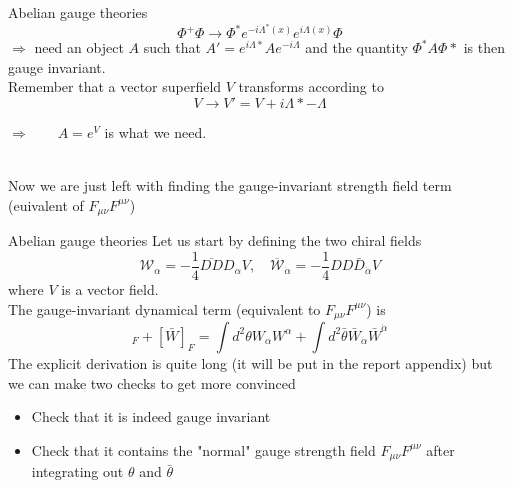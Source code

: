 \documentclass[10pt]{beamer}
\begin{document}
\begin{frame}{Abelian gauge theories}
\begin{equation*}
    \Phi^+\Phi \rightarrow \Phi^* e^{-i\Lambda^*(x)} e^{i\Lambda(x)} \Phi
\end{equation*}
$\Rightarrow$ need an object $A$ such that $A' = e^{i\Lambda*} A e^{-i\Lambda}$ and the 
quantity $\Phi^*A\Phi*$ is then gauge invariant. \\
Remember that a vector superfield $V$ transforms according to 
\begin{equation*}
    V \rightarrow V' = V + i{\Lambda* - \Lambda}
\end{equation*}
\centerline{$\Rightarrow \qquad A = e^V$ is what we need.} \\
Now we are just left with finding the gauge-invariant strength field term (euivalent of $F_{\mu\nu}F^{\mu\nu}$)
\end{frame}


\begin{frame}{Abelian gauge theories}
Let us start by defining the two chiral fields \\
\begin{equation*}
    \mathcal{W}_{\alpha}=-\frac{1}{4} \overline{D D} D_{\alpha} V, \quad \overline{\mathcal{W}}_{\dot{\alpha}} = -\frac{1}{4} D D \bar{D}_{\dot{\alpha}} V
\end{equation*}
where $V$ is a vector field. \\
The gauge-invariant dynamical term (equivalent to $F_{\mu\nu} F^{\mu\nu}$) is 
\begin{equation*}
   [W]_F + [\bar W]_F = \int d^2\theta W_{\alpha} W^{\alpha} + \int d^2\bar\theta \bar W_{\dot\alpha} \bar W^{\dot\alpha}
\end{equation*}
The explicit derivation is quite long (it will be put in the report appendix) but we can make two checks to get more convinced
\begin{itemize}
    \item Check that it is indeed gauge invariant
    \item Check that it contains the "normal" gauge strength field $F_{\mu\nu}F^{\mu\nu}$ after integrating out $\theta$ and $\bar\theta$
\end{itemize}
\end{frame}
\end{document}
